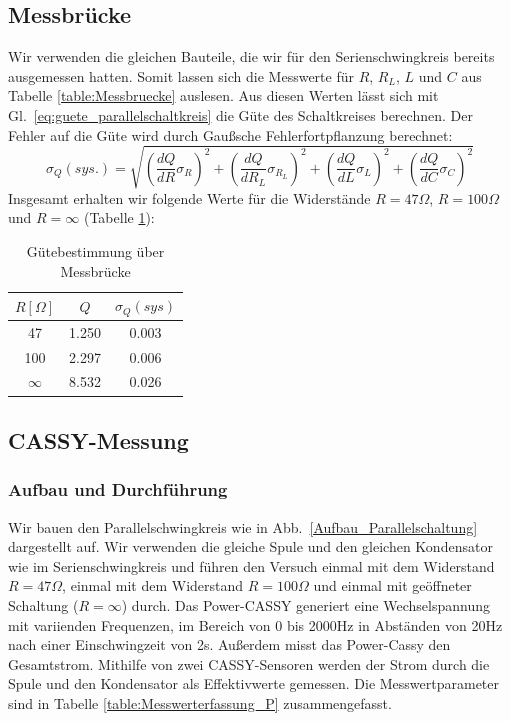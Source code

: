 \documentclass[12pt,a4paper]{article}
\begin{document}
\subsection{Messbrücke}
Wir verwenden die gleichen Bauteile, die wir für den Serienschwingkreis bereits ausgemessen hatten. Somit lassen sich die Messwerte für $R$, $R_L$, $L$ und $C$ aus Tabelle \ref{table:Messbruecke} auslesen. Aus diesen Werten lässt sich mit Gl.~\eqref{eq:guete_parallelschaltkreis} die Güte des Schaltkreises berechnen. Der Fehler auf die Güte wird durch Gaußsche Fehlerfortpflanzung berechnet:
\begin{equation}
\sigma_Q(sys.)=\sqrt{\left(\frac{dQ}{dR}\sigma_R\right)^2+\left(\frac{dQ}{dR_L}\sigma_{R_L}\right)^2+\left(\frac{dQ}{dL}\sigma_L\right)^2+\left(\frac{dQ}{dC}\sigma_C\right)^2}
\end{equation}
Insgesamt erhalten wir folgende Werte für die Widerstände $R=47\Omega$, $R=100\Omega$ und $R=\infty$ (Tabelle \ref{table:guete_messbruecke_P}):
\begin{table}[H]
	\centering
	\begin{tabular}{|c|c|c|}
		\hline
		$R[\Omega]$&$Q$&$\sigma_Q(sys)$\\
		\hline
		47&1.250&0.003\\
		100&2.297&0.006\\
		$\infty$&8.532&0.026\\
		\hline
	\end{tabular}
	\caption{Gütebestimmung über Messbrücke}
	\label{table:guete_messbruecke_P}
\end{table}

\subsection{CASSY-Messung}
\subsubsection{Aufbau und Durchführung}
Wir bauen den Parallelschwingkreis wie in Abb.~\ref{Aufbau_Parallelschaltung} dargestellt auf. Wir verwenden die gleiche Spule und den gleichen Kondensator wie im Serienschwingkreis und führen den Versuch einmal mit dem Widerstand $R=47\Omega$, einmal mit dem Widerstand $R=100\Omega$ und einmal mit geöffneter Schaltung ($R=\infty$) durch. Das Power-CASSY generiert eine Wechselspannung mit variienden Frequenzen, im Bereich von 0 bis 2000Hz in Abständen von 20Hz nach einer Einschwingzeit von 2s. Außerdem misst das Power-Cassy den Gesamtstrom. Mithilfe von zwei CASSY-Sensoren werden der Strom durch die Spule und den Kondensator als Effektivwerte gemessen. Die Messwertparameter sind in Tabelle \ref{table:Messwerterfassung_P} zusammengefasst.
\end{document}
